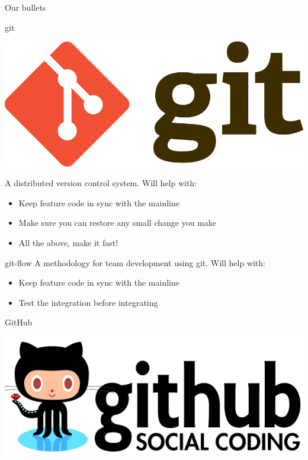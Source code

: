 \documentclass[presentation]{beamer}
\begin{document}
\begin{frame}{Our bullets}
	\begin{block}{git}
		\begin{center}
			\includegraphics[height=.1\textheight]{images/git}
		\end{center}
		
		A distributed version control system. Will help with:
		\begin{itemize}
			\item Keep feature code in sync with the mainline
			\item Make sure you can restore any small change you make
			\item All the above, make it fast!
		\end{itemize}
	\end{block}
	\begin{block}{git-flow}
		A methodology for team development using git. Will help with:
		\begin{itemize}
			\item Keep feature code in sync with the mainline
			\item Test the integration before integrating
		\end{itemize}
	\end{block}
	\begin{block}{GitHub}
		\begin{center}
			\includegraphics[height=.1\textheight]{images/github-logo}
		\end{center}
		

\end{block}
\end{frame}
\end{document}
